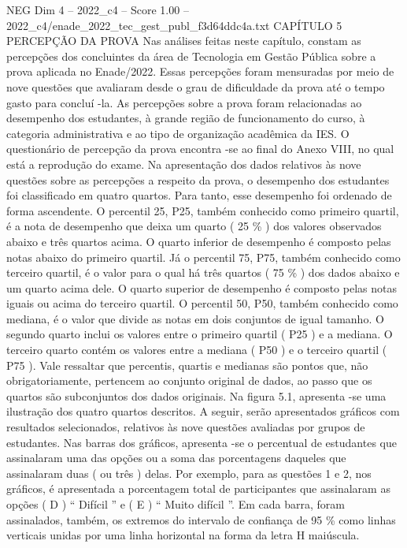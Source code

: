 \begin{textsample}{NEG Dim 4 – 2022\_c4 – Score 1.00 – 2022\_c4/enade\_2022\_tec\_gest\_publ\_f3d64ddc4a.txt}  \label{ex:f4_neg_209}
CAPÍTULO 5 PERCEPÇÃO DA PROVA Nas análises feitas neste capítulo, constam as percepções dos concluintes da área de Tecnologia em Gestão Pública sobre a prova aplicada no Enade/2022.
Essas percepções foram mensuradas por meio de nove questões que avaliaram desde o grau de dificuldade da prova até o tempo gasto para concluí -la.
As percepções sobre a prova foram relacionadas ao desempenho dos estudantes, à grande região de funcionamento do curso, à categoria administrativa e ao tipo de organização acadêmica da IES.
O questionário de percepção da prova encontra -se ao final do Anexo VIII, no qual está a reprodução do exame.
Na apresentação dos dados relativos às nove questões sobre as percepções a respeito da prova, o desempenho dos estudantes foi classificado em quatro quartos.
Para tanto, esse desempenho foi ordenado de forma ascendente.
O percentil 25, P25, também conhecido como primeiro quartil, é a nota de desempenho que deixa um quarto ( 25 \% ) dos valores observados abaixo e três quartos acima.
O quarto inferior de desempenho é composto pelas notas abaixo do primeiro quartil.
Já o percentil 75, P75, também conhecido como terceiro quartil, é o valor para o qual há três quartos ( 75 \% ) dos dados abaixo e um quarto acima dele.
O quarto superior de desempenho é composto pelas notas iguais ou acima do terceiro quartil.
O percentil 50, P50, também conhecido como mediana, é o valor que divide as notas em dois conjuntos de igual tamanho.
O segundo quarto inclui os valores entre o primeiro quartil ( P25 ) e a mediana.
O terceiro quarto contém os valores entre a mediana ( P50 ) e o terceiro quartil ( P75 ).
Vale ressaltar que percentis, quartis e medianas são pontos que, não obrigatoriamente, pertencem ao conjunto original de dados, ao passo que os quartos são subconjuntos dos dados originais.
Na figura 5.1, apresenta -se uma ilustração dos quatro quartos descritos.
A seguir, serão apresentados gráficos com resultados selecionados, relativos às nove questões avaliadas por grupos de estudantes.
Nas barras dos gráficos, apresenta -se o percentual de estudantes que assinalaram uma das opções ou a soma das porcentagens daqueles que assinalaram duas ( ou três ) delas.
Por exemplo, para as questões 1 e 2, nos gráficos, é apresentada a porcentagem total de participantes que assinalaram as opções ( D ) “ Difícil ” e ( E ) “ Muito difícil ”.
Em cada barra, foram assinalados, também, os extremos do intervalo de confiança de 95 \% como linhas verticais unidas por uma linha horizontal na forma da letra H maiúscula.

\end{textsample}
